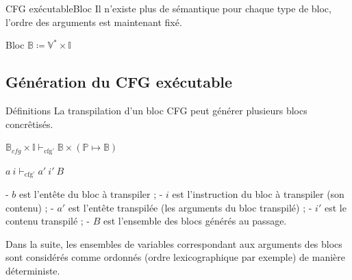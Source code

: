 \documentclass{beamer}
\begin{document}
\begin{frame}{CFG exécutable}{Bloc}
    Il n'existe plus de sémantique pour chaque type de bloc, l'ordre des arguments est maintenant fixé.
    
    \begin{block}{Bloc}
        $\mathbb{B} \coloneqq \mathbb{V}^{*} \times \mathbb{I}$%
    \end{block}
\end{frame}

\subsection{Génération du CFG exécutable}

\begin{frame}{Définitions}
    La transpilation d'un bloc CFG peut générer plusieurs blocs concrêtisés.

    $\mathbb{B}_{cfg} \times \mathbb{I} \vdash_{\text{cfg'}} \mathbb{B} \times (\mathbb{P} \mapsto \mathbb{B})$

    $a ~ i \vdash_{\text{cfg'}} a' ~ i' ~ B$

    - $b$ est l'entête du bloc à transpiler ;
    - $i$ est l'instruction du bloc à transpiler (son contenu) ;
    - $a'$ est l'entête transpilée (les arguments du bloc transpilé) ;
    - $i'$ est le contenu transpilé ;
    - $B$ est l'ensemble des blocs générés au passage.

    Dans la suite, les ensembles de variables correspondant aux arguments des blocs sont considérés comme ordonnés (ordre lexicographique par exemple) de manière déterministe.
\end{frame}
\end{document}
